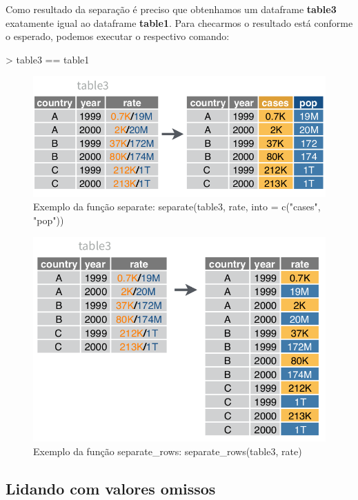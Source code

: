 \documentclass[12pt,a4paper,oneside]{erdc}
\begin{document}
Como resultado da separação é preciso que obtenhamos um dataframe \textbf{table3} exatamente igual ao dataframe \textbf{table1}. Para checarmos o resultado está conforme o esperado, podemos executar o respectivo comando:

\begin{Schunk}
\begin{Sinput}
> table3 == table1
\end{Sinput}
\end{Schunk}

\begin{figure}[htpb]
	\centering
	\includegraphics[width=.6\linewidth]{../figs/BP_Curso_TecComp_00_2019_f03-07.png}
	\caption{Exemplo da função separate: separate(table3, rate,
		into = c("cases", "pop"))}
	\label{fig:bpcursoteccomp002019f03-07}
\end{figure}






\begin{figure}[htpb]
	\centering
	\includegraphics[width=.6\linewidth]{../figs/BP_Curso_TecComp_00_2019_f03-08.png}
	\caption{Exemplo da função separate\_rows: separate\_rows(table3, rate)}
	\label{fig:bpcursoteccomp002019f03-08}
\end{figure}




\subsection{Lidando com valores omissos}
\end{document}
